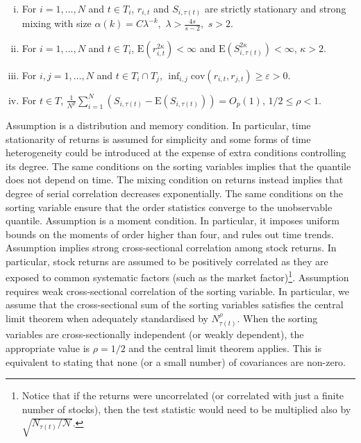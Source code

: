 \begin{assumption}
\label{ass:mixing} $ $

\begin{enumerate}[(i)]
\item For $i=1,\ldots,N$ and $t \in T_i$, $r_{i,t}$ and $S_{i,\tau(t)}$ are strictly stationary and strong mixing with size $\alpha (k)=C\lambda ^{-k},$ $\lambda >\frac{4s}{s-2},$ $s>2$. \label{ass:mixing, i} 

\item For $i=1,\ldots,N$ and $t \in T_i$, $\mathrm{E}\left( r_{i,t}^{2\kappa }\right) <\infty $ and $\mathrm{E}\left( S_{i,\tau(t)}^{2\kappa }\right) <\infty$, $\kappa >2$. \label{ass:mixing, iii}

\item For $i,j=1,\ldots, N$ and $t\in T_{i}\cap T_{j}$, $\inf_{i,j}\mathrm{cov}\left(r_{i,t},r_{j,t}\right) \geq \varepsilon >0$. \label{ass:mixing, iv}

\item For $t \in T$, $\frac{1}{N^\rho} \sum_{i=1}^N \left( S_{i,\tau(t)}-\mathrm{E}\left( S_{i,\tau(t)}\right) \right) = O_{p}(1)$,  $1/2\leq \rho <1$. \label{ass:mixing, v} 
\end{enumerate}
\end{assumption}

\noindent
Assumption  is a distribution and memory condition. In particular, time stationarity of returns is assumed for simplicity and some forms of time heterogeneity could be introduced at the expense of extra conditions controlling its degree. The same conditions on the sorting variables implies that the quantile does not depend on time. The mixing condition on returns instead implies that degree of serial correlation decreases exponentially. The same conditions on the sorting variable ensure that the order statistics converge to the unobservable quantile. Assumption  is a moment condition. In particular, it imposes uniform bounds on the moments of order higher than four, and rules out time trends. Assumption  implies strong cross-sectional correlation among stock returns. In particular, stock returns are assumed to be positively correlated as they are exposed to common systematic factors (such as the market factor)\footnote{Notice that if the returns were uncorrelated (or correlated with just a finite number of stocks), then the test statistic would need to be multiplied also by $\sqrt{N_{\tau(t)}/\mathcal{N}}$.}. Assumption  requires weak cross-sectional correlation of the sorting variable. In particular, we assume that the cross-sectional sum of the sorting variables satisfies the central limit theorem when adequately standardised by $N_{\tau(t)}^\rho$. When the sorting variables are cross-sectionally independent (or weakly dependent), the appropriate value is $\rho=1/2$ and the central limit theorem applies. This is equivalent to stating that none (or a small number) of covariances are non-zero. 


